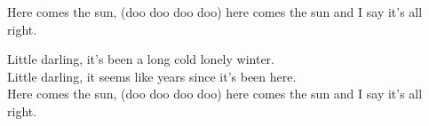 
\ns

	
\vspace{10mm}	
\ns	
\nv{}Here comes the sun, (doo doo doo doo) here comes the sun and I say it's all right.


\vspace{7mm}
\ns	
\nv{}Little darling, it's been a long cold lonely winter.\\
Little darling, it seems like years since it's been here.\\
Here comes the sun, (doo doo doo doo) here comes the sun and I say it's all right.

